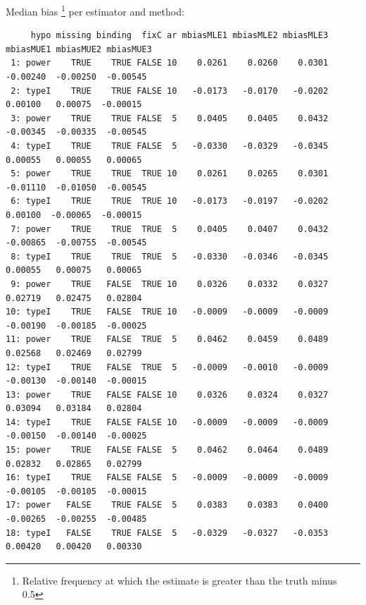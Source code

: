 \documentclass[12pt]{article}
\begin{document}
Median bias \footnote{Relative frequency at which the estimate is greater than the truth minus 0.5} per estimator and method:
\begin{adjustwidth}{-1cm}{-1cm}
\begin{verbatim}
     hypo missing binding  fixC ar mbiasMLE1 mbiasMLE2 mbiasMLE3 mbiasMUE1 mbiasMUE2 mbiasMUE3
 1: power    TRUE    TRUE FALSE 10    0.0261    0.0260    0.0301  -0.00240  -0.00250  -0.00545
 2: typeI    TRUE    TRUE FALSE 10   -0.0173   -0.0170   -0.0202   0.00100   0.00075  -0.00015
 3: power    TRUE    TRUE FALSE  5    0.0405    0.0405    0.0432  -0.00345  -0.00335  -0.00545
 4: typeI    TRUE    TRUE FALSE  5   -0.0330   -0.0329   -0.0345   0.00055   0.00055   0.00065
 5: power    TRUE    TRUE  TRUE 10    0.0261    0.0265    0.0301  -0.01110  -0.01050  -0.00545
 6: typeI    TRUE    TRUE  TRUE 10   -0.0173   -0.0197   -0.0202   0.00100  -0.00065  -0.00015
 7: power    TRUE    TRUE  TRUE  5    0.0405    0.0407    0.0432  -0.00865  -0.00755  -0.00545
 8: typeI    TRUE    TRUE  TRUE  5   -0.0330   -0.0346   -0.0345   0.00055   0.00075   0.00065
 9: power    TRUE   FALSE  TRUE 10    0.0326    0.0332    0.0327   0.02719   0.02475   0.02804
10: typeI    TRUE   FALSE  TRUE 10   -0.0009   -0.0009   -0.0009  -0.00190  -0.00185  -0.00025
11: power    TRUE   FALSE  TRUE  5    0.0462    0.0459    0.0489   0.02568   0.02469   0.02799
12: typeI    TRUE   FALSE  TRUE  5   -0.0009   -0.0010   -0.0009  -0.00130  -0.00140  -0.00015
13: power    TRUE   FALSE FALSE 10    0.0326    0.0324    0.0327   0.03094   0.03184   0.02804
14: typeI    TRUE   FALSE FALSE 10   -0.0009   -0.0009   -0.0009  -0.00150  -0.00140  -0.00025
15: power    TRUE   FALSE FALSE  5    0.0462    0.0464    0.0489   0.02832   0.02865   0.02799
16: typeI    TRUE   FALSE FALSE  5   -0.0009   -0.0009   -0.0009  -0.00105  -0.00105  -0.00015
17: power   FALSE    TRUE FALSE  5    0.0383    0.0383    0.0400  -0.00265  -0.00255  -0.00485
18: typeI   FALSE    TRUE FALSE  5   -0.0329   -0.0327   -0.0353   0.00420   0.00420   0.00330
\end{verbatim}

\end{adjustwidth}

\clearpage
\end{document}
